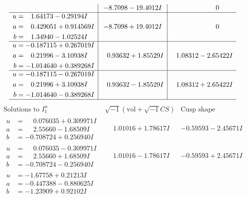 \documentclass[1p]{elsarticle_modified}
\theoremstyle{definition}
\newcommand{\I}{\sqrt{-1}}
\begin{document}
$$\begin{array}{c|c|c}
 & -8.7098 - 19.4012 I & \phantom{-0.000000 } 0 \\ \hline\begin{aligned}
u &= \phantom{-}1.64173 - 0.29194 I \\
a &= \phantom{-}0.429051 + 0.914569 I \\
b &= \phantom{-}1.34940 - 1.02524 I\end{aligned}
 & -8.7098 + 19.4012 I & \phantom{-0.000000 } 0 \\ \hline\begin{aligned}
u &= -0.187115 + 0.267019 I \\
a &= \phantom{-}0.21996 - 3.10938 I \\
b &= -1.014640 + 0.389268 I\end{aligned}
 & \phantom{-}0.93632 + 1.85529 I & \phantom{-}1.08312 - 2.65422 I \\ \hline\begin{aligned}
u &= -0.187115 - 0.267019 I \\
a &= \phantom{-}0.21996 + 3.10938 I \\
b &= -1.014640 - 0.389268 I\end{aligned}
 & \phantom{-}0.93632 - 1.85529 I & \phantom{-}1.08312 + 2.65422 I\\
 \hline 
 \end{array}$$\newpage$$\begin{array}{c|c|c}  
\text{Solutions to }I^u_{1}& \I (\text{vol} + \sqrt{-1}CS) & \text{Cusp shape}\\
 \hline 
\begin{aligned}
u &= \phantom{-}0.076035 + 0.309971 I \\
a &= \phantom{-}2.55660 - 1.68509 I \\
b &= -0.708724 + 0.256940 I\end{aligned}
 & \phantom{-}1.01016 + 1.78617 I & -0.59593 - 2.45671 I \\ \hline\begin{aligned}
u &= \phantom{-}0.076035 - 0.309971 I \\
a &= \phantom{-}2.55660 + 1.68509 I \\
b &= -0.708724 - 0.256940 I\end{aligned}
 & \phantom{-}1.01016 - 1.78617 I & -0.59593 + 2.45671 I \\ \hline\begin{aligned}
u &= -1.67758 + 0.21213 I \\
a &= -0.447388 - 0.880625 I \\
b &= -1.23909 + 0.92102 I\end{aligned}

\end{array}$$
\end{document}
